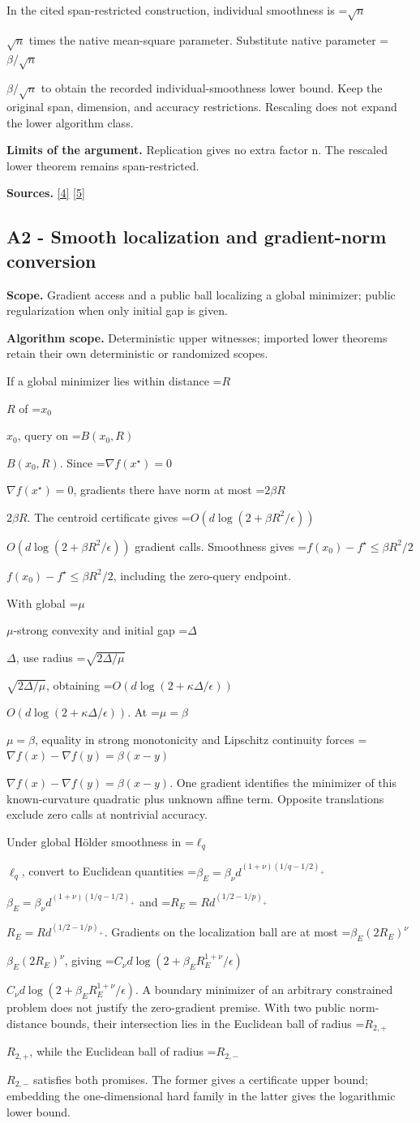 \documentclass[10pt,a4paper]{article}
\newcommand{\AtlasMath}[1]{\par\begingroup\centering\setbox0=\hbox{$\displaystyle #1$}\ifdim\wd0>1.4\linewidth\typeout{ATLAS WIDE FORMULA: \the\wd0}\fi\ifdim\wd0>\linewidth\resizebox{\linewidth}{!}{\box0}\else\box0\fi\par\endgroup}
\newcommand{\AtlasInlineMath}[1]{\begingroup\setbox0=\hbox{$#1$}\ifdim\wd0>.4\linewidth\endgroup\AtlasMath{#1}\else\endgroup$#1$\fi}
\begin{document}
In the cited span-restricted construction, individual smoothness is \AtlasInlineMath{\sqrt n} times the native mean-square parameter. Substitute native parameter \AtlasInlineMath{\beta/\sqrt n} to obtain the recorded individual-smoothness lower bound. Keep the original span, dimension, and accuracy restrictions. Rescaling does not expand the lower algorithm class.

\textbf{Limits of the argument.} Replication gives no extra factor n. The rescaled lower theorem remains span-restricted.

\textbf{Sources.} \href{https://proceedings.mlr.press/v97/zhou19b/zhou19b.pdf}{[4]} \href{https://arxiv.org/pdf/1405.4980}{[5]}

\subsection{A2 - Smooth localization and gradient-norm conversion}
\textbf{Scope.} Gradient access and a public ball localizing a global minimizer; public regularization when only initial gap is given.

\textbf{Algorithm scope.} Deterministic upper witnesses; imported lower theorems retain their own deterministic or randomized scopes.

If a global minimizer lies within distance \AtlasInlineMath{R} of \AtlasInlineMath{x_0}, query on \AtlasInlineMath{B(x_0,R)}. Since \AtlasInlineMath{\nabla f(x^\star)=0}, gradients there have norm at most \AtlasInlineMath{2\beta R}. The centroid certificate gives \AtlasInlineMath{O(d\log(2+\beta R^2/\epsilon))} gradient calls. Smoothness gives \AtlasInlineMath{f(x_0)-f^\star\le\beta R^2/2}, including the zero-query endpoint.

With global \AtlasInlineMath{\mu}-strong convexity and initial gap \AtlasInlineMath{\Delta}, use radius \AtlasInlineMath{\sqrt{2\Delta/\mu}}, obtaining \AtlasInlineMath{O(d\log(2+\kappa\Delta/\epsilon))}. At \AtlasInlineMath{\mu=\beta}, equality in strong monotonicity and Lipschitz continuity forces \AtlasInlineMath{\nabla f(x)-\nabla f(y)=\beta(x-y)}. One gradient identifies the minimizer of this known-curvature quadratic plus unknown affine term. Opposite translations exclude zero calls at nontrivial accuracy.

Under global Hölder smoothness in \AtlasInlineMath{\ell_q}, convert to Euclidean quantities
\AtlasInlineMath{\beta_E=\beta_\nu d^{(1+\nu)(1/q-1/2)_+}} and
\AtlasInlineMath{R_E=Rd^{(1/2-1/p)_+}}. Gradients on the localization ball are at most \AtlasInlineMath{\beta_E(2R_E)^\nu}, giving
\AtlasInlineMath{C_\nu d\log(2+\beta_E R_E^{1+\nu}/\epsilon)}.
A boundary minimizer of an arbitrary constrained problem does not justify the zero-gradient premise. With two public norm-distance bounds, their intersection lies in the Euclidean ball of radius \AtlasInlineMath{R_{2,+}}, while the Euclidean ball of radius \AtlasInlineMath{R_{2,-}} satisfies both promises. The former gives a certificate upper bound; embedding the one-dimensional hard family in the latter gives the logarithmic lower bound.
\end{document}
